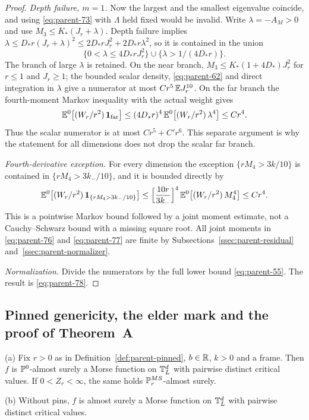 \begin{proof}
\emph{Depth failure, $m=1$.} Now the largest and the smallest eigenvalue coincide, and using \eqref{eq:parent-73} with $\Lambda$ held fixed would be invalid. Write $\lambda=-A_M>0$ and use $M_3\le K_*(J_r+\lambda)$. Depth failure implies $\lambda\le D_*r(J_r+\lambda)^2\le2D_*rJ_r^2+2D_*r\lambda^2$, so it is contained in the union
\begin{equation}\label{eq:parent-75}
\bigl\{0<\lambda\le4D_*rJ_r^2\bigr\}\cup\bigl\{\lambda>1/(4D_*r)\bigr\}.
\end{equation}
The branch of large $\lambda$ is retained. On the near branch, $M_3\le K_*(1+4D_*)J_r^2$ for $r\le1$ and $J_r\ge1$; the bounded scalar density, \eqref{eq:parent-62} and direct integration in $\lambda$ give a numerator at most $Cr^5\,\mathbb E J_r^{10}$. On the far branch the fourth-moment Markov inequality with the actual weight gives
\begin{equation}\label{eq:parent-76}
\mathbb E^0\bigl[(W_r/r^2)\,\mathbf 1_{\rm far}\bigr]\le(4D_*r)^4\,\mathbb E^0\bigl[(W_r/r^2)\,\lambda^4\bigr]\le Cr^4 .
\end{equation}
Thus the scalar numerator is at most $Cr^5+C'r^6$. This separate argument is why the statement for all dimensions does not drop the scalar far branch.

\emph{Fourth-derivative exception.} For every dimension the exception $\{rM_4>3k/10\}$ is contained in $\{rM_4>3k_-/10\}$, and it is bounded directly by
\begin{equation}\label{eq:parent-77}
\mathbb E^0\bigl[(W_r/r^2)\,\mathbf 1_{\{rM_4>3k_-/10\}}\bigr]\le\Bigl[\frac{10r}{3k_-}\Bigr]^4\,\mathbb E^0\bigl[(W_r/r^2)\,M_4^4\bigr]\le Cr^4 .
\end{equation}
This is a pointwise Markov bound followed by a joint moment estimate, not a Cauchy--Schwarz bound with a missing square root. All joint moments in \eqref{eq:parent-76} and \eqref{eq:parent-77} are finite by Subsections~\ref{ssec:parent-residual} and~\ref{ssec:parent-normalizer}.

\emph{Normalization.} Divide the numerators by the full lower bound \eqref{eq:parent-55}. The result is \eqref{eq:parent-78}.
\end{proof}

\subsection{Pinned genericity, the elder mark and the proof of Theorem~A}\label{ssec:parent-generic}

\begin{lemma}[genericity]\label{lem:parent-generic}
\textup{(a)} Fix $r>0$ as in Definition~\ref{def:parent-pinned}, $b\in\mathbb R$, $k>0$ and a frame. Then $f$ is $\mathbb P^0$-almost surely a Morse function on $\mathbb T^d_L$ with pairwise distinct critical values. If $0<Z_r<\infty$, the same holds $\mathbb P^{MS}_r$-almost surely.

\textup{(b)} Without pins, $f$ is almost surely a Morse function on $\mathbb T^d_L$ with pairwise distinct critical values.
\end{lemma}

